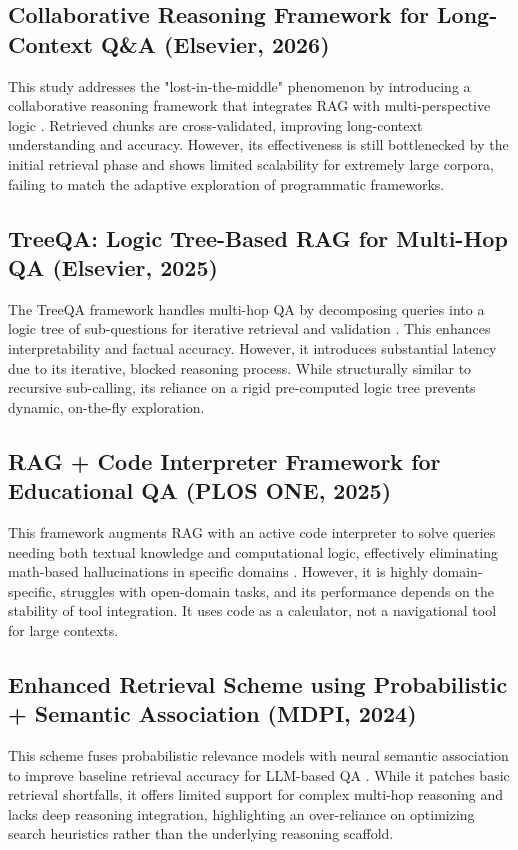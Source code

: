 \subsection*{Collaborative Reasoning Framework for Long-Context Q\&A (Elsevier, 2026)}
This study addresses the "lost-in-the-middle" phenomenon \cite{liu2024} by introducing a collaborative reasoning framework that integrates RAG with multi-perspective logic \cite{collaboration2026}. Retrieved chunks are cross-validated, improving long-context understanding and accuracy. However, its effectiveness is still bottlenecked by the initial retrieval phase and shows limited scalability for extremely large corpora, failing to match the adaptive exploration of programmatic frameworks.

\subsection*{TreeQA: Logic Tree-Based RAG for Multi-Hop QA (Elsevier, 2025)}
The TreeQA framework handles multi-hop QA by decomposing queries into a logic tree of sub-questions for iterative retrieval and validation \cite{treeqa2025}. This enhances interpretability and factual accuracy. However, it introduces substantial latency due to its iterative, blocked reasoning process. While structurally similar to recursive sub-calling, its reliance on a rigid pre-computed logic tree prevents dynamic, on-the-fly exploration.

\subsection*{RAG + Code Interpreter Framework for Educational QA (PLOS ONE, 2025)}
This framework augments RAG with an active code interpreter to solve queries needing both textual knowledge and computational logic, effectively eliminating math-based hallucinations in specific domains \cite{codeinterpreter2025}. However, it is highly domain-specific, struggles with open-domain tasks, and its performance depends on the stability of tool integration. It uses code as a calculator, not a navigational tool for large contexts.

\subsection*{Enhanced Retrieval Scheme using Probabilistic + Semantic Association (MDPI, 2024)}
This scheme fuses probabilistic relevance models with neural semantic association to improve baseline retrieval accuracy for LLM-based QA \cite{enhanced2024}. While it patches basic retrieval shortfalls, it offers limited support for complex multi-hop reasoning and lacks deep reasoning integration, highlighting an over-reliance on optimizing search heuristics rather than the underlying reasoning scaffold.

